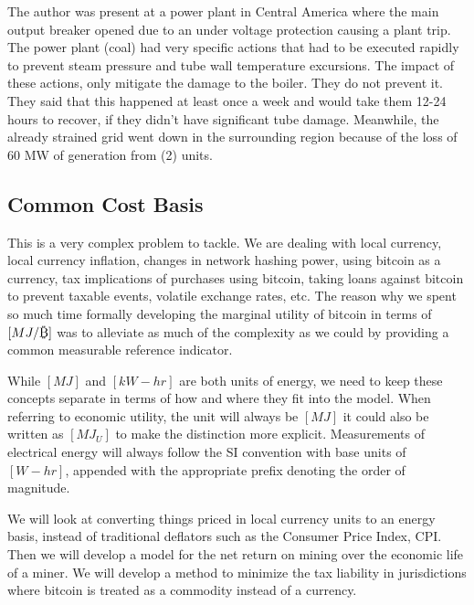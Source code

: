 \documentclass[runningheads]{llncs}
\def\bitcoin{
    \leavevmode
    \vtop{\offinterlineskip %
    \setbox0=\hbox{B}
    \setbox2=\hbox to\wd0{\hfil\hskip-.03em
    \vrule height .3ex width .15ex\hskip .08em
    \vrule height .3ex width .15ex\hfil}
    \vbox{\copy2\box0}\box2}
}
\begin{document}
The author was present at a power plant in Central America where the main output breaker opened due to an under voltage protection causing a plant trip.
The power plant (coal) had very specific actions that had to be executed rapidly to prevent steam pressure and tube wall temperature excursions.
The impact of these actions, only mitigate the damage to the boiler.
They do not prevent it.
They said that this happened at least once a week and would take them 12-24 hours to recover, if they didn't have significant tube damage.
Meanwhile, the already strained grid went down in the surrounding region because of the loss of 60 MW of generation from (2) units.

\subsection{Common Cost Basis}
This is a very complex problem to tackle.
We are dealing with local currency, local currency inflation, changes in network hashing power, using bitcoin as a currency, tax implications of purchases using bitcoin, taking loans against bitcoin to prevent taxable events, volatile exchange rates, etc.
The reason why we spent so much time formally developing the marginal utility of bitcoin in terms of $[MJ/\bitcoin]$ was to alleviate as much of the complexity as we could by providing a common measurable reference indicator.

While $[MJ]$ and $[kW-hr]$ are both units of energy, we need to keep these concepts separate in terms of how and where they fit into the model.
When referring to economic utility, the unit will always be $[MJ]$ it could also be written as $[MJ_U]$ to make the distinction more explicit.
Measurements of electrical energy will always follow the SI convention with base units of $[W-hr]$, appended with the appropriate prefix denoting the order of magnitude.

We will look at converting things priced in local currency units to an energy basis, instead of traditional deflators such as the Consumer Price Index, CPI.
Then we will develop a model for the net return on mining over the economic life of a miner.
We will develop a method to minimize the tax liability in jurisdictions where bitcoin is treated as a commodity instead of a currency.

\end{document}
